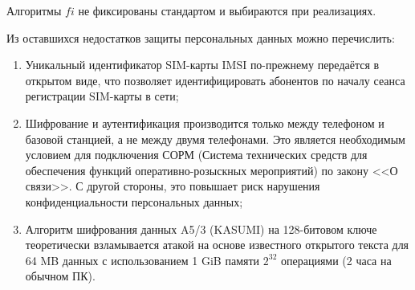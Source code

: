 Алгоритмы $fi$ не фиксированы стандартом и выбираются при реализациях.

Из оставшихся недостатков защиты персональных данных можно перечислить:
\begin{enumerate}
    \item Уникальный идентификатор SIM-карты IMSI по-прежнему передаётся в открытом виде, что позволяет идентифицировать абонентов по началу сеанса регистрации SIM-карты в сети;
    \item Шифрование и аутентификация производится только между телефоном и базовой станцией, а не между двумя телефонами. Это является необходимым условием для подключения СОРМ (Система технических средств для обеспечения функций оперативно-розыскных мероприятий) по закону <<О связи>>. С другой стороны, это повышает риск нарушения конфиденциальности персональных данных;
    \item Алгоритм шифрования данных A5/3 (KASUMI) на 128-битовом ключе теоретически взламывается атакой на основе известного открытого текста для 64 MB данных с использованием 1 GiB памяти $2^{32}$ операциями (2 часа на обычном ПК).
\end{enumerate}

